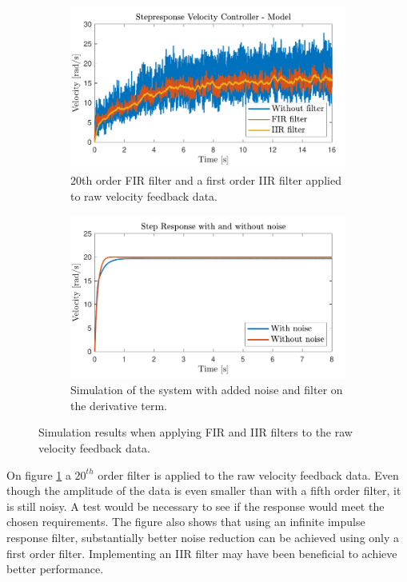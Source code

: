 \documentclass[../../main.tex]{subfiles}
\begin{document}
\begin{figure}[H]
     \centering
     \begin{subfigure}[b]{0.49\textwidth}
         \centering
    \includegraphics[width=\textwidth]{Sections/Miscellaneous/Images/FilteredStepRespons20Order.pdf}
    \caption{20th order FIR filter and a first order IIR filter applied to raw velocity feedback data.}
    \label{fig:FilteredStepRespons20Order}
     \end{subfigure}
     \hfill
     \begin{subfigure}[b]{0.49\textwidth}
         \centering
         \includegraphics[width=\textwidth]{Sections/Miscellaneous/Images/StepResponsAddedNoiseAndFilter.pdf}
         \caption{Simulation of the system with added noise and filter on the derivative term.}
         \label{fig:StepResponsAddedNoiseAndFilter}
     \end{subfigure}
        \caption{Simulation results when applying FIR and IIR filters to the raw velocity feedback data.}
        \label{fig:FilterDiskussionImplementedFilter20}
\end{figure}
On figure \ref{fig:FilteredStepRespons20Order} a $20^{th}$ order filter is applied to the raw velocity feedback data. Even though the amplitude of the data is even smaller than with a fifth order filter, it is still noisy. A test would be necessary to see if the response would meet the chosen requirements. The figure also shows that using an infinite impulse response filter, substantially better noise reduction can be achieved using only a first order filter. Implementing an IIR filter may have been beneficial to achieve better performance.
\end{document}
